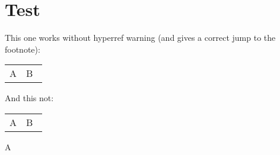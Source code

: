 \documentclass[pdftex]{article}
\begin{document}
\section{Test}

\noindent This one works without hyperref warning (and gives a correct jump to the footnote):
\begin{longtable}{ll}
A & B~\footnotemark\\
\end{longtable}

\noindent And this not:
\begin{longtable*}{ll}
A & B~\footnotemark\\
\end{longtable*}

\clearpage
A
\end{document}
